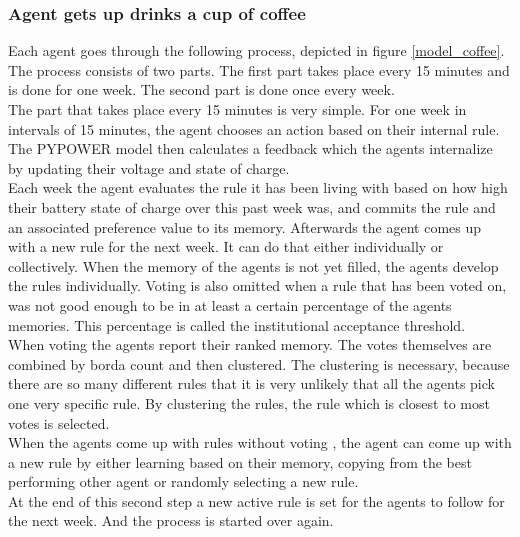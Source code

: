 \documentclass[a4paper]{article}
\begin{document}
\subsubsection{Agent gets up drinks a cup of coffee}
Each agent goes through the following process, depicted in figure \ref{model_coffee}. The process consists of two parts. 
The first part takes place every 15 minutes and is done for one week. The second part is done once every week. \\
The part that takes place every 15 minutes is very simple.
For one week in intervals of 15 minutes, the agent 
chooses an action based on their internal rule. The PYPOWER model then calculates a feedback which the agents internalize
by updating their voltage and state of charge.\\
Each week the agent evaluates the rule it has been living with based on how 
high their battery state of charge over this past week was, and commits the rule and an associated preference value to 
its memory. 
Afterwards the agent comes up with a new rule for the next week. It can do that either individually or collectively. 
When the memory of the agents is not yet 
filled, the agents develop the rules individually. 
Voting is also omitted when a rule that has been voted on, was not good 
enough to be in at least a certain percentage of the agents memories. This percentage is called the institutional acceptance
threshold. \\
When voting the agents report their ranked memory. The votes themselves are combined by borda count and then clustered.  
The clustering is necessary, because there are so many different rules that it is very unlikely that all the agents 
pick one very specific rule. By clustering the rules, the rule which is closest to most votes is selected. \\
When the agents come up with rules without voting , the agent can come up with a new rule by either 
learning based on their memory, copying from the best performing other 
agent or randomly selecting a new rule. \\
At the end of this second step a new active rule is set for the agents to follow for the next week.
And the process is started over again.
\end{document}
